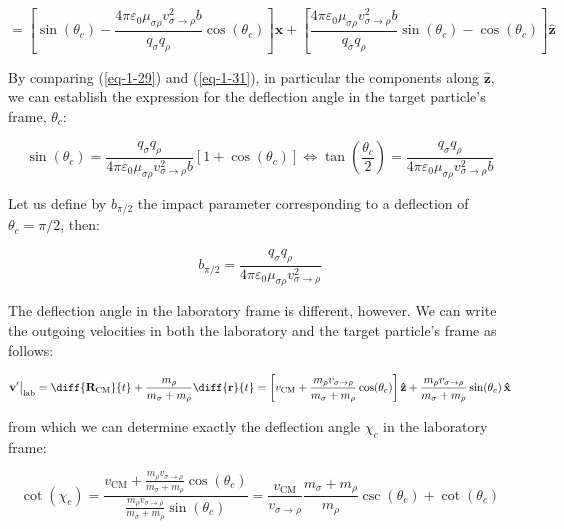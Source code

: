 \begin{equation}
    \label{eq-1-31}
    =\left[\sin(\theta_c)-\frac{4\pi\varepsilon_0\mu_{\sigma\rho}v_{\sigma\to\rho}^2b}{q_\sigma q_\rho}\cos(\theta_c)\right]\mathbf{\hat{x}}+\left[\frac{4\pi\varepsilon_0\mu_{\sigma\rho}v_{\sigma\to\rho}^2b}{q_\sigma q_\rho}\sin(\theta_c)-\cos(\theta_c)\right]\mathbf{\hat{z}}
\end{equation}

By comparing (\ref{eq-1-29}) and (\ref{eq-1-31}), in particular the components along $\mathbf{\hat{z}}$, we can establish the expression for the deflection angle in the target particle's frame, $\theta_c$:

\begin{equation}
    \label{eq-1-32}
    \sin(\theta_c)=\frac{q_\sigma q_\rho}{4\pi\varepsilon_0\mu_{\sigma\rho}v_{\sigma\to\rho}^2b}\left[1+\cos(\theta_c)\right]\Longleftrightarrow\tan\left(\frac{\theta_c}{2}\right)=\frac{q_\sigma q_\rho}{4\pi\varepsilon_0\mu_{\sigma\rho}v_{\sigma\to\rho}^2b}
\end{equation}

Let us define by $b_{\pi/2}$ the impact parameter corresponding to a deflection of $\theta_c=\pi/2$, then:

\begin{equation}
    b_{\pi/2}=\frac{q_\sigma q_\rho}{4\pi\varepsilon_0\mu_{\sigma\rho}v_{\sigma\to\rho}^2}
\end{equation}

The deflection angle in the laboratory frame is different, however. We can write the outgoing velocities in both the laboratory and the target particle's frame as follows:

\begin{equation*}
    \mathbf{v'}\bigr|_\text{lab}=\diff{\mathbf{R}_\text{CM}}{t}+\frac{m_\rho}{m_\sigma+m_\rho}\diff{\mathbf{r}}{t}=\left[v_\text{CM}+\frac{m_\rho v_{\sigma\to\rho}}{m_\sigma+m_\rho}\cos(\theta_c)\right]\mathbf{\hat{z}}+\frac{m_\rho v_{\sigma\to\rho}}{m_\sigma+m_\rho}\sin(\theta_c)\,\mathbf{\hat{x}}
\end{equation*}

from which we can determine exactly the deflection angle $\chi_c$ in the laboratory frame:

\begin{equation*}
    \cot(\chi_c)=\frac{v_\text{CM}+\frac{m_\rho v_{\sigma\to\rho}}{m_\sigma+m_\rho}\cos(\theta_c)}{\frac{m_\rho v_{\sigma\to\rho}}{m_\sigma+m_\rho}\sin(\theta_c)}=\frac{v_\text{CM}}{v_{\sigma\to\rho}}\frac{m_\sigma+m_\rho}{m_\rho}\csc(\theta_c)+\cot(\theta_c)
\end{equation*}

